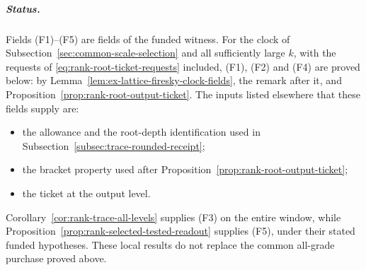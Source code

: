 \subparagraph{Status.} Fields (F1)--(F5) are fields of the funded witness.
For the clock of Subsection~\ref{sec:common-scale-selection} and all
sufficiently large $k$, with the requests of
\eqref{eq:rank-root-ticket-requests} included, (F1), (F2) and (F4) are
proved below: by Lemma~\ref{lem:ex-lattice-firesky-clock-fields}, the
remark after it, and Proposition~\ref{prop:rank-root-output-ticket}. The
inputs listed elsewhere that these fields supply are:
\begin{itemize}
\item the allowance and the root-depth identification used in
 Subsection~\ref{subsec:trace-rounded-receipt};
\item the bracket property used after
 Proposition~\ref{prop:rank-root-output-ticket};
\item the ticket at the output level.
\end{itemize}
Corollary~\ref{cor:rank-trace-all-levels} supplies (F3) on the entire
window, while Proposition~\ref{prop:rank-selected-tested-readout}
supplies (F5), under their stated funded hypotheses. These local results
do not replace the common all-grade purchase proved above.

